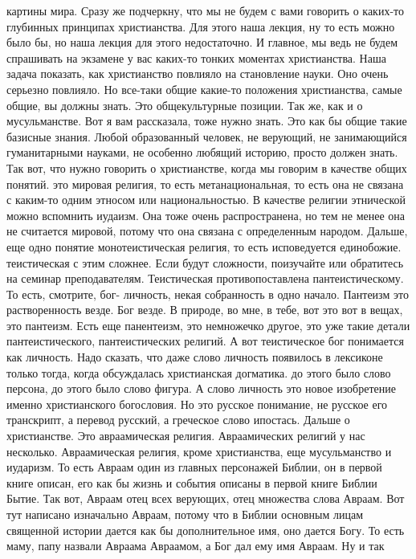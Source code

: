 картины мира. Сразу же подчеркну, что мы не будем с вами говорить о каких-то
глубинных принципах христианства. Для этого наша лекция, ну то есть можно было
бы, но наша лекция для этого недостаточно. И главное, мы ведь не будем
спрашивать на экзамене у вас каких-то тонких моментах христианства. Наша задача
показать, как христианство повлияло на становление науки. Оно очень серьезно
повлияло. Но все-таки общие какие-то положения христианства, самые общие, вы
должны знать. Это общекультурные позиции. Так же, как и о мусульманстве. Вот я
вам рассказала, тоже нужно знать. Это как бы общие такие базисные знания. Любой
образованный человек, не верующий, не занимающийся гуманитарными науками, не
особенно любящий историю, просто должен знать. Так вот, что нужно говорить о
христианстве, когда мы говорим в качестве общих понятий. это мировая религия, то
есть метанациональная, то есть она не связана с каким-то одним этносом или
национальностью. В качестве религии этнической можно вспомнить иудаизм. Она тоже
очень распространена, но тем не менее она не считается мировой, потому что она
связана с определенным народом. Дальше, еще одно понятие монотеистическая
религия, то есть исповедуется единобожие. теистическая с этим сложнее. Если
будут сложности, поизучайте или обратитесь на семинар преподавателям.
Теистическая противопоставлена пантеистическому. То есть, смотрите, бог-
личность, некая собранность в одно начало. Пантеизм это растворенность везде.
Бог везде. В природе, во мне, в тебе, вот это вот в вещах, это пантеизм. Есть
еще панентеизм, это немножечко другое, это уже такие детали пантеистического,
пантеистических религий. А вот теистическое бог понимается как личность. Надо
сказать, что даже слово личность появилось в лексиконе только тогда, когда
обсуждалась христианская догматика. до этого было слово персона, до этого было
слово фигура. А слово личность это новое изобретение именно христианского
богословия. Но это русское понимание, не русское его транскрипт, а перевод
русский, а греческое слово ипостась. Дальше о христианстве. Это авраамическая
религия. Авраамических религий у нас несколько. Авраамическая религия, кроме
христианства, еще мусульманство и иударизм. То есть Авраам один из главных
персонажей Библии, он в первой книге описан, его как бы жизнь и события описаны
в первой книге Библии Бытие. Так вот, Авраам отец всех верующих, отец множества
слова Авраам. Вот тут написано изначально Авраам, потому что в Библии основным
лицам священной истории дается как бы дополнительное имя, оно дается Богу. То
есть маму, папу назвали Авраама Авраамом, а Бог дал ему имя Авраам. Ну и так
